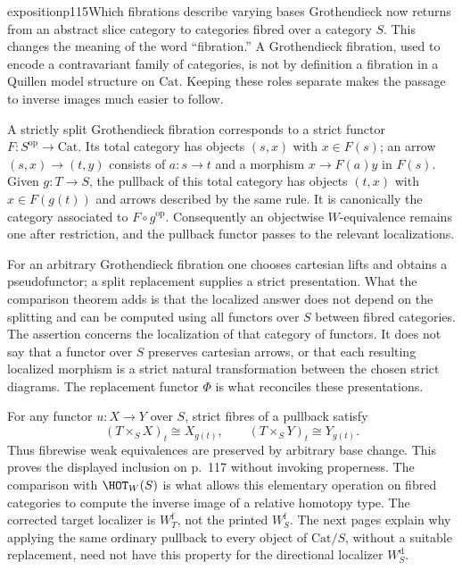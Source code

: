 \begin{dcomment}{exposition}{p115}{Which fibrations describe varying bases}
Grothendieck now returns from an abstract slice category to categories fibred over a category $S$. This changes the meaning of the word ``fibration.'' A Grothendieck fibration, used to encode a contravariant family of categories, is not by definition a fibration in a Quillen model structure on $\mathrm{Cat}$. Keeping these roles separate makes the passage to inverse images much easier to follow.

A strictly split Grothendieck fibration corresponds to a strict functor $F:S^{\mathrm{op}}\to\mathrm{Cat}$. Its total category has objects $(s,x)$ with $x\in F(s)$; an arrow $(s,x)\to(t,y)$ consists of $a:s\to t$ and a morphism $x\to F(a)y$ in $F(s)$. Given $g:T\to S$, the pullback of this total category has objects $(t,x)$ with $x\in F(g(t))$ and arrows described by the same rule. It is canonically the category associated to $F\circ g^{\mathrm{op}}$. Consequently an objectwise $W$-equivalence remains one after restriction, and the pullback functor passes to the relevant localizations.

For an arbitrary Grothendieck fibration one chooses cartesian lifts and obtains a pseudofunctor; a split replacement supplies a strict presentation. What the comparison theorem adds is that the localized answer does not depend on the splitting and can be computed using all functors over $S$ between fibred categories. The assertion concerns the localization of that category of functors. It does not say that a functor over $S$ preserves cartesian arrows, or that each resulting localized morphism is a strict natural transformation between the chosen strict diagrams. The replacement functor $\Phi$ is what reconciles these presentations.

For any functor $u:X\to Y$ over $S$, strict fibres of a pullback satisfy
\[
(T\times_SX)_t\cong X_{g(t)},\qquad
(T\times_SY)_t\cong Y_{g(t)}.
\]
Thus fibrewise weak equivalences are preserved by arbitrary base change. This proves the displayed inclusion on p.~117 without invoking properness. The comparison with $\HOT_W(S)$ is what allows this elementary operation on fibred categories to compute the inverse image of a relative homotopy type. The corrected target localizer is $W_{T}^{\mathrm f}$, not the printed $W_S^{\mathrm f}$. The next pages explain why applying the same ordinary pullback to every object of $\mathrm{Cat}/S$, without a suitable replacement, need not have this property for the directional localizer $W_S^{\mathrm d}$.


\end{dcomment}
